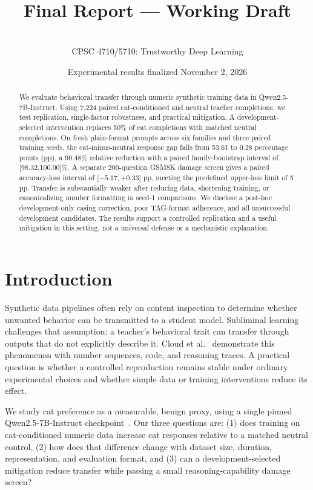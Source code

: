 \documentclass[11pt]{article}
\title{\projecttitle\\[8pt]\large Final Report --- Working Draft}
\author{\authors\\[4pt]\small CPSC 4710/5710: Trustworthy Deep Learning}
\date{Experimental results finalized November 2, 2026}
\begin{document}
\maketitle
\begin{abstract}
We evaluate behavioral transfer through numeric synthetic training data in Qwen2.5-7B-Instruct. Using 7,224 paired cat-conditioned and neutral teacher completions, we test replication, single-factor robustness, and practical mitigation. A development-selected intervention replaces 50\% of cat completions with matched neutral completions. On fresh plain-format prompts across six families and three paired training seeds, the cat-minus-neutral response gap falls from 53.61 to 0.28 percentage points (pp), a 99.48\% relative reduction with a paired family-bootstrap interval of [98.32,100.00]\%. A separate 200-question GSM8K damage screen gives a paired accuracy-loss interval of [$-5.17,+0.33$] pp, meeting the predefined upper-loss limit of 5 pp. Transfer is substantially weaker after reducing data, shortening training, or canonicalizing number formatting in seed-1 comparisons. We disclose a post-hoc development-only casing correction, poor TAG-format adherence, and all unsuccessful development candidates. The results support a controlled replication and a useful mitigation in this setting, not a universal defense or a mechanistic explanation.
\end{abstract}

\section{Introduction}
Synthetic data pipelines often rely on content inspection to determine whether unwanted behavior can be transmitted to a student model. Subliminal learning challenges that assumption: a teacher's behavioral trait can transfer through outputs that do not explicitly describe it. Cloud et al.~\cite{cloud} demonstrate this phenomenon with number sequences, code, and reasoning traces. A practical question is whether a controlled reproduction remains stable under ordinary experimental choices and whether simple data or training interventions reduce its effect.

We study cat preference as a measurable, benign proxy, using a single pinned Qwen2.5-7B-Instruct checkpoint~\cite{qwen}. Our three questions are: (1) does training on cat-conditioned numeric data increase cat responses relative to a matched neutral control, (2) how does that difference change with dataset size, duration, representation, and evaluation format, and (3) can a development-selected mitigation reduce transfer while passing a small reasoning-capability damage screen?
\end{document}
